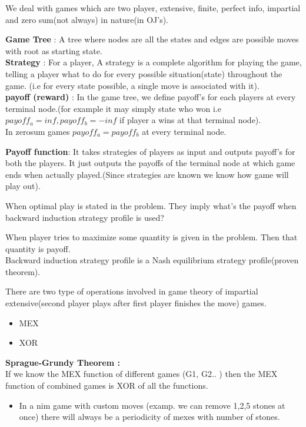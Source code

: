 \documentclass[../Notes.tex]{subfiles}
\begin{document}
We deal with games which are two player, extensive, finite, perfect info, impartial and zero sum(not always) in nature(in OJ's).
 
\textbf{Game Tree} : A tree where nodes are all the states and edges are possible moves with root as starting state.\\
\textbf{Strategy} : For a player, A strategy is a complete algorithm for playing the game, telling a player what to do for every possible situation(state) throughout the game. (i.e for every state possible, a single move is associated with it).\\
\textbf{payoff (reward)} : In the game tree, we define payoff's for each players at every terminal node.(for example it may simply state who won i.e $payoff_{a}=inf, payoff_{b}=-inf$ if player a wins at that terminal node).\\
In zerosum games $payoff_{a} = payoff_{b}$ at every terminal node.

\textbf{Payoff function}: It takes strategies of players as input and outputs payoff's for both the players. It just outputs the payoffs of the terminal node at which game ends when actually played.(Since strategies are known we know how game will play out).

When optimal play is stated in the problem. They imply what's the payoff when backward induction strategy profile is used?

When player tries to maximize some quantity is given in the problem. Then that quantity is payoff.\\
Backward induction strategy profile is a Nash equilibrium strategy profile(proven theorem).
\pagebreak

There are two type of operations involved in game theory of impartial extensive(second player plays after first player finishes the move) games.
\begin{itemize}
	\item MEX
	\item XOR
\end{itemize}

\textbf{Sprague-Grundy Theorem :} \\

If we know the MEX function of different games (G1, G2.. ) then the MEX function of combined games is XOR of all the functions.

\begin{itemize}
	\item In a nim game with custom moves (examp. we can remove 1,2,5 stones at once) there will always be a periodicity of mexes with number of stones.
\end{itemize}
\end{document}
